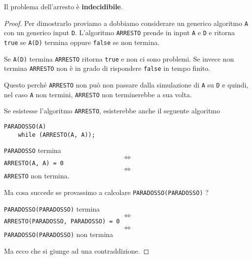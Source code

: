 \begin{theorem}
	Il problema dell'arresto \`e \textbf{indecidibile}.
	\begin{proof}
		Per dimostrarlo proviamo a dobbiamo considerare un generico algoritmo \verb|A| con un generico input \verb|D|.
		L'algoritmo \verb|ARRESTO| prende in input \verb|A| e \verb|D| e ritorna \verb|true| se \verb|A(D)| termina
		oppure \verb|false| se non termina.

		Se \verb|A(D)| termina \verb|ARRESTO| ritorna \verb|true| e non ci sono problemi. Se invece non termina
		\verb|ARRESTO| non \`e in grado di rispondere \verb|false| in tempo finito.

		Questo perch\'e \verb|ARRESTO| non pu\`o non passare dalla simulazione di \verb|A| su \verb|D| e quindi, nel caso
		\verb|A| non termini, \verb|ARRESTO| non terminerebbe a sua volta.

		Se esistesse l'algoritmo \verb|ARRESTO|, esisterebbe anche il seguente algoritmo
		\begin{lstlisting}[style=pseudo-style]
PARADOSSO(A)
	while (ARRESTO(A, A));
		\end{lstlisting}
		\begin{center}
			\verb|PARADOSSO| termina
			\[ \Leftrightarrow \]
			\verb|ARRESTO(A, A) = 0|
			\[ \Leftrightarrow \]
			\verb|ARRESTO| non termina.
		\end{center}

		Ma cosa succede se provassimo a calcolare \verb|PARADOSSO(PARADOSSO)| ?
		\begin{center}
			\verb|PARADOSSO(PARADOSSO)| termina
			\[ \Leftrightarrow \]
			\verb|ARRESTO(PARADOSSO, PARADOSSO) = 0|
			\[ \Leftrightarrow \]
			\verb|PARADOSSO(PARADOSSO)| non termina
		\end{center}
		Ma ecco che si giunge ad una contraddizione.
	\end{proof}
\end{theorem}
